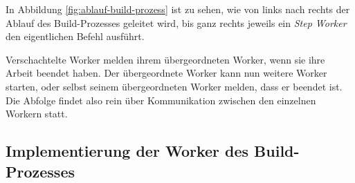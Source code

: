 In Abbildung \ref{fig:ablauf-build-prozess} ist zu sehen, wie von links nach rechts der Ablauf des Build-Prozesses geleitet wird, bis ganz rechts jeweils ein \emph{Step Worker} den eigentlichen Befehl ausführt.

Verschachtelte Worker melden ihrem übergeordneten Worker, wenn sie ihre Arbeit beendet haben. Der übergeordnete Worker kann nun weitere Worker starten, oder selbst seinem übergeordneten Worker melden, dass er beendet ist. Die Abfolge findet also rein über Kommunikation zwischen den einzelnen Workern statt.

\subsection{Implementierung der Worker des Build-Prozesses}
